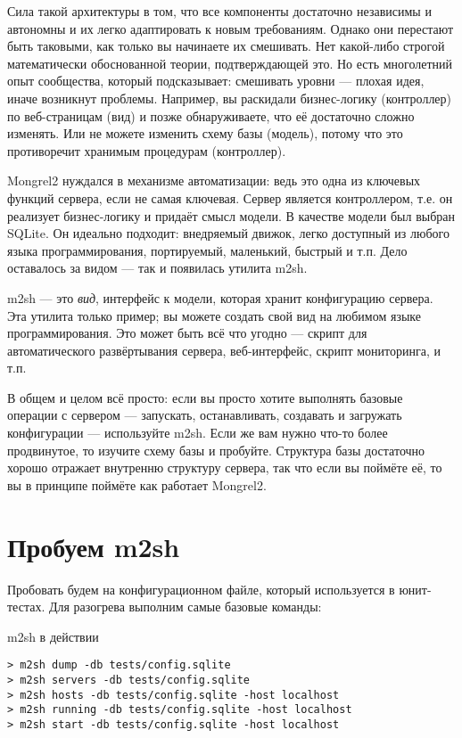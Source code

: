 Сила такой архитектуры в том, что все компоненты достаточно независимы
и автономны и их легко адаптировать к новым требованиям. Однако они
перестают быть таковыми, как только вы начинаете их смешивать.  Нет
какой-либо строгой математически обоснованной теории, подтверждающей
это. Но есть многолетний опыт сообщества, который подсказывает:
смешивать уровни --- плохая идея, иначе возникнут проблемы. Например,
вы раскидали бизнес-логику (контроллер) по веб-страницам (вид) и позже
обнаруживаете, что её достаточно сложно изменять.  Или не можете
изменить схему базы (модель), потому что это противоречит хранимым
процедурам (контроллер).

Mongrel2 нуждался в механизме автоматизации: ведь это одна из ключевых
функций сервера, если не самая ключевая. Сервер является контроллером,
т.е.  он реализует бизнес-логику и придаёт смысл модели. В качестве
модели был выбран SQLite. Он идеально подходит: внедряемый движок,
легко доступный из любого языка программирования, портируемый,
маленький, быстрый и т.п. Дело оставалось за видом --- так и появилась
утилита m2sh.

m2sh --- это \emph{вид}, интерфейс к модели, которая хранит
конфигурацию сервера. Эта утилита только пример; вы можете создать
свой вид на любимом языке программирования. Это может быть всё что
угодно --- скрипт для автоматического развёртывания сервера,
веб-интерфейс, скрипт мониторинга, и т.п.

В общем и целом всё просто: если вы просто хотите выполнять базовые
операции с сервером --- запускать, останавливать, создавать и
загружать конфигурации --- используйте m2sh. Если же вам нужно что-то
более продвинутое, то изучите схему базы и пробуйте. Структура базы
достаточно хорошо отражает внутренню структуру сервера, так что если
вы поймёте её, то вы в принципе поймёте как работает Mongrel2.

\section{Пробуем m2sh}

Пробовать будем на конфигурационном файле, который используется в
юнит-тестах. Для разогрева выполним самые базовые команды:

\begin{code}{m2sh в действии}
\begin{lstlisting}
> m2sh dump -db tests/config.sqlite
> m2sh servers -db tests/config.sqlite
> m2sh hosts -db tests/config.sqlite -host localhost
> m2sh running -db tests/config.sqlite -host localhost
> m2sh start -db tests/config.sqlite -host localhost
\end{lstlisting}
\end{code}

